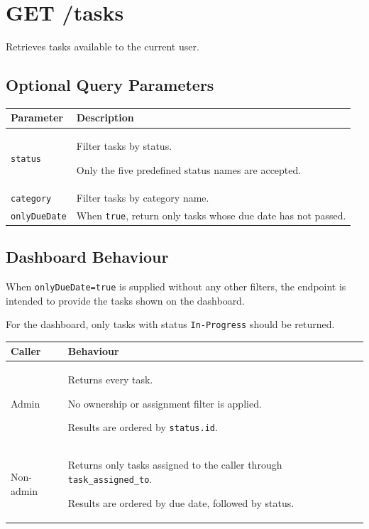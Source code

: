 \documentclass[11pt,a4paper]{article}
\begin{document}
\section{GET /tasks}

Retrieves tasks available to the current user.

\subsection{Optional Query Parameters}

\begin{longtable}{@{}p{3.0cm}p{13.18cm}@{}}
\toprule
\textbf{Parameter} & \textbf{Description} \\
\midrule
\endhead

\texttt{status} &
Filter tasks by status.

Only the five predefined status names are accepted.
\\

\texttt{category} &
Filter tasks by category name.
\\

\texttt{onlyDueDate} &
When \texttt{true}, return only tasks whose due date has not
passed.
\\

\bottomrule
\end{longtable}


\subsection{Dashboard Behaviour}

When \texttt{onlyDueDate=true} is supplied without any other
filters, the endpoint is intended to provide the tasks shown
on the dashboard.

For the dashboard, only tasks with status
\texttt{In-Progress} should be returned.

\begin{longtable}{@{}p{3.0cm}p{13.18cm}@{}}
\toprule
\textbf{Caller} & \textbf{Behaviour} \\
\midrule
\endhead

Admin &
Returns every task.

No ownership or assignment filter is applied.

Results are ordered by \texttt{status.id}.
\\[4pt]

Non-admin &
Returns only tasks assigned to the caller through
\texttt{task\_assigned\_to}.

Results are ordered by due date, followed by status.
\\

\bottomrule
\end{longtable}
\end{document}
